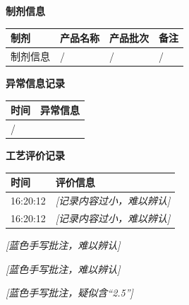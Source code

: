 \documentclass[UTF8,10pt,a4paper,fontset=fandol]{ctexart}
\newcommand{\fieldvalue}[1]{#1}
\newcommand{\handwritten}[1]{#1}
\begin{document}
\begin{minipage}[t]{0.48\textwidth}
\vspace{2mm}
\textbf{制剂信息}

\begin{tabularx}{\linewidth}{|l|X|l|X|}
\hline
制剂 & 产品名称 & 产品批次 & 备注 \\
\hline
制剂信息 &
\fieldvalue{/} &
\fieldvalue{/} &
\fieldvalue{/} \\
\hline
\end{tabularx}

\vspace{2mm}
\textbf{异常信息记录}

\begin{tabularx}{\linewidth}{|l|X|}
\hline
时间 & 异常信息 \\
\hline
\fieldvalue{/} & \\
\hline
\end{tabularx}

\vspace{2mm}
\textbf{工艺评价记录}

\begin{tabularx}{\linewidth}{|l|X|}
\hline
时间 & 评价信息 \\
\hline
16:20:12 & \textit{[记录内容过小，难以辨认]} \\
16:20:12 & \textit{[记录内容过小，难以辨认]} \\
\hline
\end{tabularx}

\vspace{2mm}
\handwritten{\textit{[蓝色手写批注，难以辨认]}}

\vspace{1mm}
\handwritten{\textit{[蓝色手写批注，难以辨认]}}

\vspace{1mm}
\handwritten{\textit{[蓝色手写批注，疑似含“2.5”]}}
\end{minipage}
\hfill
\end{document}
